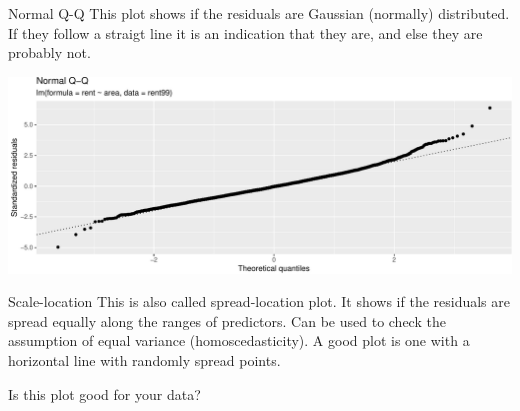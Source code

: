 \documentclass[
  ignorenonframetext,
]{beamer}
\newenvironment{Shaded}{\begin{snugshade}}{\end{snugshade}}
\newcommand{\AttributeTok}[1]{\textcolor[rgb]{0.13,0.29,0.53}{#1}}
\newcommand{\DecValTok}[1]{\textcolor[rgb]{0.00,0.00,0.81}{#1}}
\newcommand{\FunctionTok}[1]{\textcolor[rgb]{0.13,0.29,0.53}{\textbf{#1}}}
\newcommand{\NormalTok}[1]{#1}
\newcommand{\SpecialCharTok}[1]{\textcolor[rgb]{0.81,0.36,0.00}{\textbf{#1}}}
\newcommand{\StringTok}[1]{\textcolor[rgb]{0.31,0.60,0.02}{#1}}
\begin{document}
\begin{frame}[fragile]
\begin{block}{Normal Q-Q}
\label{normal-q-q}
This plot shows if the residuals are Gaussian (normally) distributed. If
they follow a straigt line it is an indication that they are, and else
they are probably not.

\begin{Shaded}
\end{Shaded}

\includegraphics{Module02MLRPresentationWeek1_files/figure-beamer/unnamed-chunk-8-1.pdf}
\end{block}
\end{frame}

\begin{frame}
\begin{block}{Scale-location}
\label{scale-location}
This is also called spread-location plot. It shows if the residuals are
spread equally along the ranges of predictors. Can be used to check the
assumption of equal variance (homoscedasticity). A good plot is one with
a horizontal line with randomly spread points.

Is this plot good for your data?
\end{block}
\end{frame}
\end{document}
